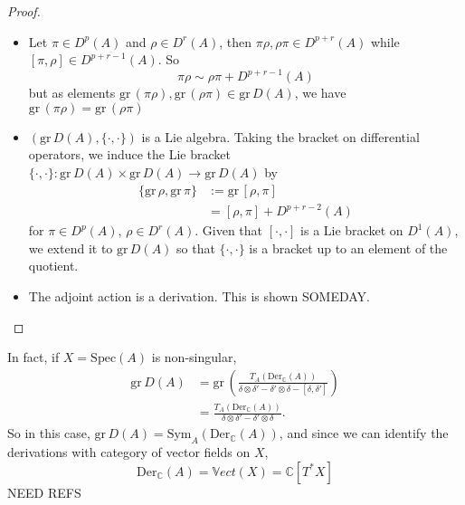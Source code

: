 \label{prop:grading_is_poisson}
\begin{proof}
\begin{itemize}
    \item Let $\pi \in D^p(A)$ and $\rho \in D^r(A)$, then $\pi \rho, \rho \pi \in D^{p+r}(A)$ while $[\pi, \rho] \in D^{p+r-1}(A)$.
    So 
    \begin{equation}
        \pi \rho \sim \rho \pi + D^{p+r-1}(A)
    \end{equation}
    but as elements $\mathrm{gr}\,(\pi \rho), \mathrm{gr}\,(\rho \pi) \in \mathrm{gr} \, D(A)$, we have $\mathrm{gr}\,(\pi \rho) = \mathrm{gr}\,(\rho \pi)$
    \item $\left(\mathrm{gr} \, D(A), \{\cdot, \cdot\} \right)$ is a Lie algebra. 
    Taking the bracket on differential operators, we induce the Lie bracket $\{\cdot,\cdot\} : \mathrm{gr}\, D(A) \times \mathrm{gr}\, D(A) \rightarrow \mathrm{gr}\, D(A) $ by 
    \begin{align*}
        \{\mathrm{gr} \,\rho, \mathrm{gr}\, \pi\} &:= \mathrm{gr}\,  [\rho, \pi] \\
        &= [\rho,\pi] + D^{p+r-2}(A)
    \end{align*}
    for $\pi \in D^p(A)$, $\rho \in D^r(A)$. Given that $[\cdot,\cdot]$ is a Lie bracket on $D^1(A)$, we extend it to $\mathrm{gr} \, D(A)$ so that $\{\cdot, \cdot\}$ is a bracket up to an element of the quotient. 
    \item The adjoint action is a derivation. This is shown SOMEDAY.
\end{itemize}
\end{proof}

In fact, if $X = \mathrm{Spec}(A)$ is non-singular,
\begin{align*}
    \mathrm{gr}\, D(A) &= \mathrm{gr}\, \left( \frac{T_A(\mathrm{Der}_\mathbb{C}(A))}{\delta \otimes \delta' - \delta' \otimes \delta - [\delta,\delta']}  \right)\\
    &= \frac{T_A(\mathrm{Der}_\mathbb{C}(A))}{\delta \otimes \delta' - \delta' \otimes \delta}.
\end{align*}
So in this case, $\mathrm{gr}\, D(A) = \mathrm{Sym}_A(\mathrm{Der}_\mathbb{C}(A))$, and since we can identify the derivations with category of vector fields on $X$,
\begin{equation}
    \mathrm{Der}_\mathbb{C}(A) = \mathbb{V}ect(X) = \mathbb{C}[T^*X]
\end{equation}
NEED REFS
